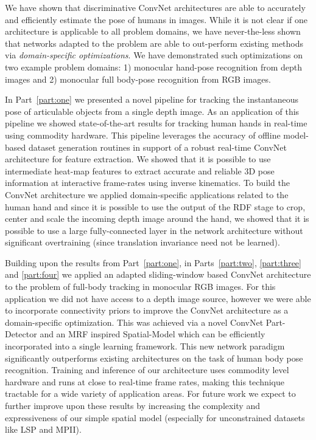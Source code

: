 We have shown that discriminative ConvNet architectures are able to accurately and efficiently estimate the pose of humans in images. While it is not clear if one architecture is applicable to all problem domains, we have never-the-less shown that networks adapted to the problem are able to out-perform existing methods via \emph{domain-specific optimizations}. We have demonstrated such optimizations on two example problem domains:  1) monocular hand-pose recognition from depth images and 2) monocular full body-pose recognition from RGB images.

In Part~\ref{part:one} we presented a novel pipeline for tracking the instantaneous pose of articulable objects from a single depth image. As an application of this pipeline we showed state-of-the-art results for tracking human hands in real-time using commodity hardware. This pipeline leverages the accuracy of offline model-based dataset generation routines in support of a robust real-time ConvNet architecture for feature extraction. We showed that it is possible to use intermediate heat-map features to extract accurate and reliable 3D pose information at interactive frame-rates using inverse kinematics. To build the ConvNet architecture we applied domain-specific applications related to the human hand and since it is possible to use the output of the RDF stage to crop, center and scale the incoming depth image around the hand, we showed that it is possible to use a large fully-connected layer in the network architecture without significant overtraining (since translation invariance need not be learned).

Building upon the results from Part~\ref{part:one}, in Parts~\ref{part:two}, \ref{part:three} and \ref{part:four} we applied an adapted sliding-window based ConvNet architecture to the problem of full-body tracking in monocular RGB images.  For this application we did not have access to a depth image source, however we were able to incorporate connectivity priors to improve the ConvNet architecture as a domain-specific optimization. This was achieved via a novel ConvNet Part-Detector and an MRF inspired Spatial-Model which can be efficiently incorporated into a single learning framework. This new network paradigm significantly outperforms existing architectures on the task of human body pose recognition.  Training and inference of our architecture uses commodity level hardware and runs at close to real-time frame rates, making this technique tractable for a wide variety of application areas.  For future work we expect to further improve upon these results by increasing the complexity and expressiveness of our simple spatial model (especially for unconstrained datasets like LSP and MPII).

